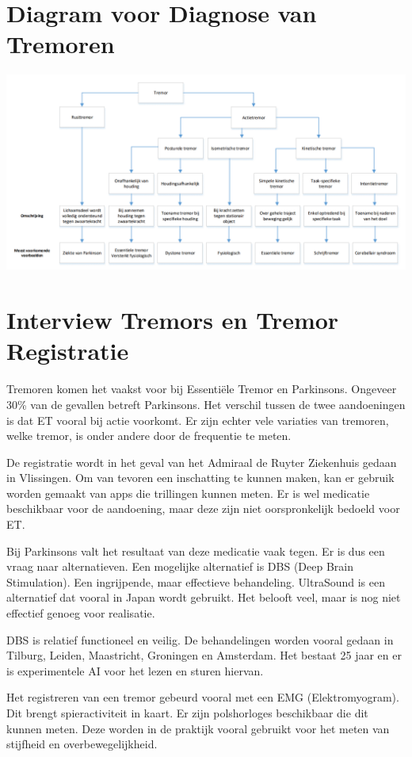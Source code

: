 \appendix
\section{Diagram voor Diagnose van Tremoren}
\label{appendix:diagnose}

\includegraphics[width=\textwidth]{graphics/graph-tremor-diagnosis.png}

\section{Interview Tremors en Tremor Registratie}

Tremoren komen het vaakst voor bij Essentiële Tremor en Parkinsons.
Ongeveer 30\% van de gevallen betreft Parkinsons.
Het verschil tussen de twee aandoeningen is dat ET vooral bij actie voorkomt.
Er zijn echter vele variaties van tremoren, welke tremor, is onder andere door de frequentie te meten.

De registratie wordt in het geval van het Admiraal de Ruyter Ziekenhuis gedaan in Vlissingen.
Om van tevoren een inschatting te kunnen maken, kan er gebruik worden gemaakt van apps die trillingen kunnen meten.
Er is wel medicatie beschikbaar voor de aandoening, maar deze zijn niet oorspronkelijk bedoeld voor ET.

Bij Parkinsons valt het resultaat van deze medicatie vaak tegen. Er is dus een vraag naar alternatieven.
Een mogelijke alternatief is DBS (Deep Brain Stimulation). Een ingrijpende, maar effectieve behandeling.
UltraSound is een alternatief dat vooral in Japan wordt gebruikt. Het belooft veel,
maar is nog niet effectief genoeg voor realisatie.

DBS is relatief functioneel en veilig. De behandelingen worden vooral gedaan in Tilburg, Leiden,
Maastricht, Groningen en Amsterdam. Het bestaat 25 jaar en er is experimentele AI voor het lezen en sturen hiervan.

Het registreren van een tremor gebeurd vooral met een EMG (Elektromyogram). Dit brengt spieractiviteit in kaart.
Er zijn polshorloges beschikbaar die dit kunnen meten. 
Deze worden in de praktijk vooral gebruikt voor het meten van stijfheid en overbewegelijkheid.